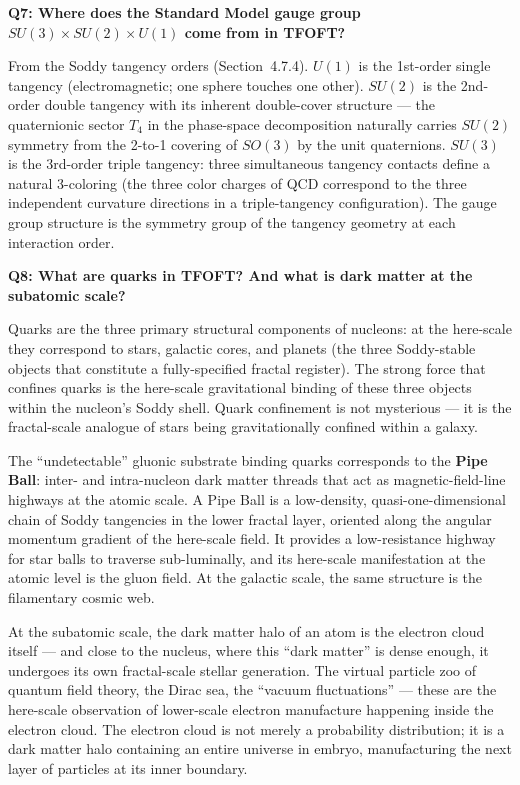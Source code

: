  \begin{mdframed}
  \textbf{Q7: Where does the Standard Model gauge group $SU(3) \times SU(2) \times U(1)$
  come from in TFOFT?}
  \end{mdframed}

  From the Soddy tangency orders (Section~4.7.4). $U(1)$ is the 1st-order single
  tangency (electromagnetic; one sphere touches one other). $SU(2)$ is the
  2nd-order double tangency with its inherent double-cover structure --- the
  quaternionic sector $T_4$ in the phase-space decomposition naturally carries
  $SU(2)$ symmetry from the 2-to-1 covering of $SO(3)$ by the unit quaternions.
  $SU(3)$ is the 3rd-order triple tangency: three simultaneous tangency contacts
  define a natural 3-coloring (the three color charges of QCD correspond to the
  three independent curvature directions in a triple-tangency configuration).
  The gauge group structure is the symmetry group of the tangency geometry at
  each interaction order.

  \begin{mdframed}
  \textbf{Q8: What are quarks in TFOFT? And what is dark matter at the subatomic scale?}
  \end{mdframed}

  Quarks are the three primary structural components of nucleons: at the here-scale
  they correspond to stars, galactic cores, and planets (the three Soddy-stable
  objects that constitute a fully-specified fractal register). The strong force that
  confines quarks is the here-scale gravitational binding of these three objects
  within the nucleon's Soddy shell. Quark confinement is not mysterious --- it is
  the fractal-scale analogue of stars being gravitationally confined within a galaxy.

  The ``undetectable'' gluonic substrate binding quarks corresponds to the
  \textbf{Pipe Ball}: inter- and intra-nucleon dark matter threads that act as
  magnetic-field-line highways at the atomic scale. A Pipe Ball is a low-density,
  quasi-one-dimensional chain of Soddy tangencies in the lower fractal layer,
  oriented along the angular momentum gradient of the here-scale field. It provides
  a low-resistance highway for star balls to traverse sub-luminally, and its
  here-scale manifestation at the atomic level is the gluon field. At the galactic
  scale, the same structure is the filamentary cosmic web.

  At the subatomic scale, the dark matter halo of an atom is the electron cloud
  itself --- and close to the nucleus, where this ``dark matter'' is dense enough,
  it undergoes its own fractal-scale stellar generation. The virtual particle zoo
  of quantum field theory, the Dirac sea, the ``vacuum fluctuations'' --- these
  are the here-scale observation of lower-scale electron manufacture happening
  inside the electron cloud. The electron cloud is not merely a probability
  distribution; it is a dark matter halo containing an entire universe in embryo,
  manufacturing the next layer of particles at its inner boundary.


